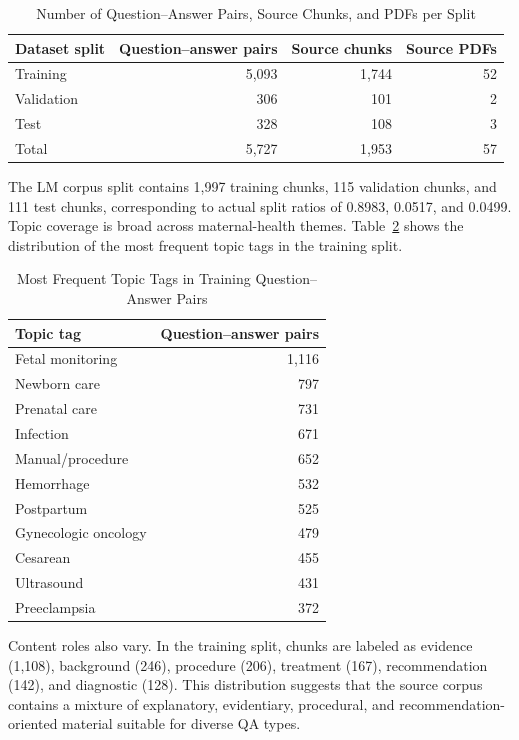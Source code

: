 \documentclass[conference]{IEEEtran}
\begin{document}
\begin{table}[t]
\caption{Number of Question--Answer Pairs, Source Chunks, and PDFs per Split}
\label{tab:qa_splits}
\centering
\scriptsize
\setlength{\tabcolsep}{2pt}
\begin{tabular}{|p{}|r|r|r|}
\hline
\textbf{Dataset split} & \textbf{Question--answer pairs} & \textbf{Source chunks} & \textbf{Source PDFs} \\
\hline
Training & 5,093 & 1,744 & 52 \\
Validation & 306 & 101 & 2 \\
Test & 328 & 108 & 3 \\
\hline
Total & 5,727 & 1,953 & 57 \\
\hline
\end{tabular}
\end{table}

The LM corpus split contains 1,997 training chunks, 115 validation chunks, and 111 test chunks, corresponding to actual split ratios of 0.8983, 0.0517, and 0.0499. Topic coverage is broad across maternal-health themes. Table~\ref{tab:topics} shows the distribution of the most frequent topic tags in the training split.

\begin{table}[t]
\caption{Most Frequent Topic Tags in Training Question--Answer Pairs}
\label{tab:topics}
\centering
\begin{tabular}{|l|r|}
\hline
\textbf{Topic tag} & \textbf{Question--answer pairs} \\
\hline
Fetal monitoring & 1,116 \\
Newborn care & 797 \\
Prenatal care & 731 \\
Infection & 671 \\
Manual/procedure & 652 \\
Hemorrhage & 532 \\
Postpartum & 525 \\
Gynecologic oncology & 479 \\
Cesarean & 455 \\
Ultrasound & 431 \\
Preeclampsia & 372 \\
\hline
\end{tabular}
\end{table}

Content roles also vary. In the training split, chunks are labeled as evidence (1,108), background (246), procedure (206), treatment (167), recommendation (142), and diagnostic (128). This distribution suggests that the source corpus contains a mixture of explanatory, evidentiary, procedural, and recommendation-oriented material suitable for diverse QA types.
\end{document}
